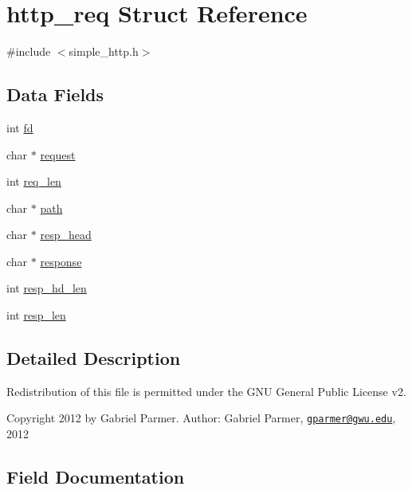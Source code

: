 \hypertarget{structhttp__req}{}\section{http\+\_\+req Struct Reference}
\label{structhttp__req}


{\ttfamily \#include $<$simple\+\_\+http.\+h$>$}

\subsection*{Data Fields}
\begin{DoxyCompactItemize}
\item 
int \hyperlink{structhttp__req_a1bbc2953bd25c056007726499c6aa25e}{fd}
\item 
char $\ast$ \hyperlink{structhttp__req_abba001314209aa313480e5dbc72526fa}{request}
\item 
int \hyperlink{structhttp__req_a9159a052203ea48a87be91c7f671f31c}{req\+\_\+len}
\item 
char $\ast$ \hyperlink{structhttp__req_a81824888fb0747a20a59cd708b4f894f}{path}
\item 
char $\ast$ \hyperlink{structhttp__req_a3c6a0958ad6776a0f4083e783417b827}{resp\+\_\+head}
\item 
char $\ast$ \hyperlink{structhttp__req_ab7c817594b1d5f1f9fab631b95605b5c}{response}
\item 
int \hyperlink{structhttp__req_a2c384dc8fd52baccbffb273fa9a99948}{resp\+\_\+hd\+\_\+len}
\item 
int \hyperlink{structhttp__req_a4e2566b23f613c01dba8f31a8478caea}{resp\+\_\+len}
\end{DoxyCompactItemize}


\subsection{Detailed Description}
Redistribution of this file is permitted under the G\+N\+U General Public License v2.

Copyright 2012 by Gabriel Parmer. Author\+: Gabriel Parmer, \href{mailto:gparmer@gwu.edu}{\tt gparmer@gwu.\+edu}, 2012 

\subsection{Field Documentation}
\hypertarget{structhttp__req_a1bbc2953bd25c056007726499c6aa25e}{}
